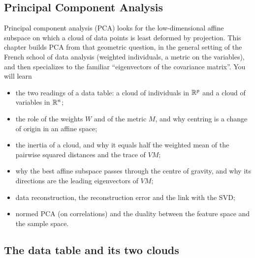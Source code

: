 \begin{notechapter}
\chapter{Principal Component Analysis}\label{ch:pca-overview}

\forgetcs\horzbar\newcommand*{\horzbar}{\rule[.5ex]{4ex}{0.5pt}}%
\forgetcs\vertbar\newcommand*{\vertbar}{\rule[-1ex]{0.5pt}{4ex}}%
\forgetcs\Tr\newcommand{\Tr}{\operatorname{Tr}}%

\begin{chapterintro}
Principal component analysis (PCA) looks for the low-dimensional affine subspace on
which a cloud of data points is least deformed by projection. This chapter builds PCA
from that geometric question, in the general setting of the French school of data
analysis (weighted individuals, a metric on the variables), and then specializes to
the familiar ``eigenvectors of the covariance matrix''. You will learn
\begin{itemize}[nosep]
  \item the two readings of a data table: a cloud of individuals in $\mathbb{R}^p$ and a cloud
        of variables in $\mathbb{R}^n$;
  \item the role of the weights $W$ and of the metric $M$, and why centring is a change
        of origin in an affine space;
  \item the inertia of a cloud, and why it equals half the weighted mean of the pairwise
        squared distances and the trace of $VM$;
  \item why the best affine subspace passes through the centre of gravity, and why its
        directions are the leading eigenvectors of $VM$;
  \item data reconstruction, the reconstruction error and the link with the SVD;
  \item normed PCA (on correlations) and the duality between the feature space and the
        sample space.
\end{itemize}
\end{chapterintro}

\section{The data table and its two clouds}\label{pca-overview:sec:data}


\end{notechapter}

